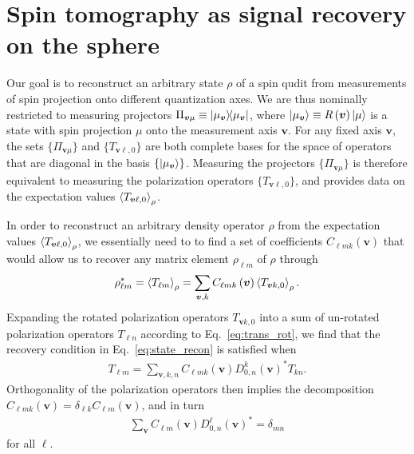 \documentclass[a4paper,twocolumn,unpublished]{quantumarticle}
\newcommand{\p}[1]{\left(#1\right)} %
\newcommand{\bk}{\Braket} %
\renewcommand{\set}[1]{\{#1\}} %
\begin{document}
\section{Spin tomography as signal recovery on the sphere}
\label{sec:signal_recovery}


Our goal is to reconstruct an arbitrary state $\rho$ of a spin qudit from measurements of spin projection onto different quantization axes.
We are thus nominally restricted to measuring projectors $\Pi_{\bm v\mu} \equiv \op{\mu_{\bm v}}$, where $\ket{\mu_{\bm v}}\equiv R\p{\bm v}\ket{\mu}$ is a state with spin projection $\mu$ onto the measurement axis $\bm v$.
For any fixed axis $\bm v$, the sets $\set{\Pi_{\bm v\mu}}$ and $\set{T_{\bm v\ell,0}}$ are both complete bases for the space of operators that are diagonal in the basis $\set{\ket{\mu_{\bm v}}}$.
Measuring the projectors $\set{\Pi_{\bm v\mu}}$ is therefore equivalent to measuring the polarization operators $\set{T_{\bm v\ell,0}}$, and provides data on the expectation values $\bk{T_{\bm v\ell,0}}_\rho$.

In order to reconstruct an arbitrary density operator $\rho$ from the expectation values $\bk{T_{\bm v\ell,0}}_\rho$, we essentially need to to find a set of coefficients $C_{\ell mk}\p{\bm v}$ that would allow us to recover any matrix element $\rho_{\ell m}$ of $\rho$ through
\begin{align}
  \rho_{\ell m}^* = \bk{T_{\ell m}}_\rho
  = \sum_{\bm v,k} C_{\ell mk}\p{\bm v} \bk{T_{\bm vk,0}}_\rho.
  \label{eq:state_recon}
\end{align}
Expanding the rotated polarization operators $T_{\bm vk,0}$ into a sum of un-rotated polarization operators $T_{\ell n}$ according to Eq.~\eqref{eq:trans_rot}, we find that the recovery condition in Eq.~\eqref{eq:state_recon} is satisfied when
\begin{align}
  T_{\ell m}
  = \sum_{\bm v,k,n} C_{\ell mk}\p{\bm v} D^k_{0,n}\p{\bm v}^* T_{kn}.
\end{align}
Orthogonality of the polarization operators then implies the decomposition $C_{\ell mk}\p{\bm v}=\delta_{\ell k}C_{\ell m}\p{\bm v}$, and in turn
\begin{align}
  \sum_{\bm v} C_{\ell m}\p{\bm v} D^\ell_{0,n}\p{\bm v}^*
  = \delta_{mn}
  \label{eq:tomo_recovery}
\end{align}
for all $\ell$.
\end{document}

